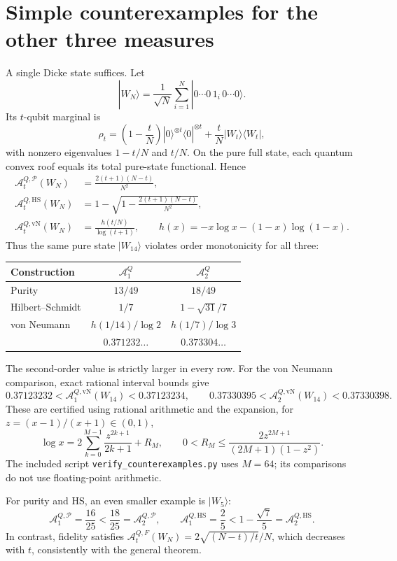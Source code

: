 \documentclass[11pt]{article}
\newcommand{\A}{\mathcal A}
\begin{document}
\section*{Simple counterexamples for the other three measures}
A single Dicke state suffices. Let
\[
 |W_N\rangle=\frac1{\sqrt N}\sum_{i=1}^N
 |0\cdots 0\,1_i\,0\cdots0\rangle.
\]
Its $t$-qubit marginal is
\[
 \rho_t=\left(1-\frac tN\right)|0\rangle^{\otimes t}\langle0|^{\otimes t}
       +\frac tN|W_t\rangle\langle W_t|,
\]
with nonzero eigenvalues $1-t/N$ and $t/N$. On the pure full state, each quantum convex roof equals its total pure-state functional. Hence
\begin{align*}
 \A_t^{Q,\mathcal P}(W_N)&=\frac{2(t+1)(N-t)}{N^2},\\
 \A_t^{Q,\mathrm{HS}}(W_N)&=1-\sqrt{1-\frac{2(t+1)(N-t)}{N^2}},\\
 \A_t^{Q,\mathrm{vN}}(W_N)&=\frac{h(t/N)}{\log(t+1)},
 \qquad h(x)=-x\log x-(1-x)\log(1-x).
\end{align*}
Thus the same pure state $|W_{14}\rangle$ violates order monotonicity for all three:
\begin{center}
\renewcommand{\arraystretch}{1.35}
\begin{tabular}{lcc}
Construction & $\A_1^Q$ & $\A_2^Q$\\\hline
Purity & $13/49$ & $18/49$\\
Hilbert--Schmidt & $1/7$ & $1-\sqrt{31}/7$\\
von Neumann & $h(1/14)/\log2$ & $h(1/7)/\log3$\\
 & $0.371232\ldots$ & $0.373304\ldots$
\end{tabular}
\end{center}
The second-order value is strictly larger in every row. For the von Neumann comparison, exact rational interval bounds give
\[
 0.37123232<\A_1^{Q,\mathrm{vN}}(W_{14})<0.37123234,
 \qquad
 0.37330395<\A_2^{Q,\mathrm{vN}}(W_{14})<0.37330398.
\]
These are certified using rational arithmetic and the expansion, for $z=(x-1)/(x+1)\in(0,1)$,
\[
 \log x=2\sum_{k=0}^{M-1}\frac{z^{2k+1}}{2k+1}+R_M,
 \qquad 0<R_M\le\frac{2z^{2M+1}}{(2M+1)(1-z^2)}.
\]
The included script \texttt{verify\_counterexamples.py} uses $M=64$; its comparisons do not use floating-point arithmetic.

For purity and HS, an even smaller example is $|W_5\rangle$:
\[
 \A_1^{Q,\mathcal P}=\frac{16}{25}<\frac{18}{25}=\A_2^{Q,\mathcal P},
 \qquad
 \A_1^{Q,\mathrm{HS}}=\frac25<1-\frac{\sqrt7}{5}=\A_2^{Q,\mathrm{HS}}.
\]
In contrast, fidelity satisfies
$\A_t^{Q,F}(W_N)=2\sqrt{(N-t)/t}/N$, which decreases with $t$, consistently with the general theorem.
\end{document}
